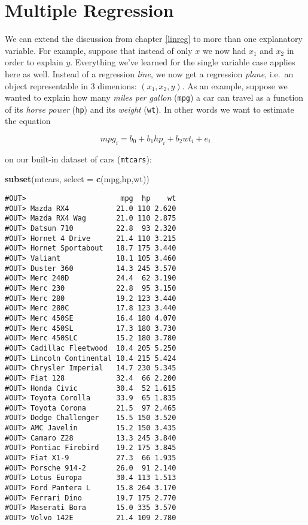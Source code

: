 \documentclass[]{book}
\newenvironment{Shaded}{\begin{snugshade}}{\end{snugshade}}
\newcommand{\KeywordTok}[1]{\textcolor[rgb]{0.13,0.29,0.53}{\textbf{#1}}}
\newcommand{\DataTypeTok}[1]{\textcolor[rgb]{0.13,0.29,0.53}{#1}}
\newcommand{\NormalTok}[1]{#1}
\begin{document}
\chapter{Multiple Regression}\label{multiple-reg}

We can extend the discussion from chapter \ref{linreg} to more than one
explanatory variable. For example, suppose that instead of only \(x\) we
now had \(x_1\) and \(x_2\) in order to explain \(y\). Everything we've
learned for the single variable case applies here as well. Instead of a
regression \emph{line}, we now get a regression \emph{plane}, i.e.~an
object representable in 3 dimenions: \((x_1,x_2,y)\). As an example,
suppose we wanted to explain how many \emph{miles per gallon}
(\texttt{mpg}) a car can travel as a function of its \emph{horse power}
(\texttt{hp}) and its \emph{weight} (\texttt{wt}). In other words we
want to estimate the equation

\begin{equation}
mpg_i = b_0 + b_1 hp_i + b_2 wt_i + e_i \label{eq:abline2d}
\end{equation}

on our built-in dataset of cars (\texttt{mtcars}):

\begin{Shaded}
\begin{Highlighting}[]
\KeywordTok{subset}\NormalTok{(mtcars, }\DataTypeTok{select =} \KeywordTok{c}\NormalTok{(mpg,hp,wt))}
\end{Highlighting}
\end{Shaded}

\begin{verbatim}
#OUT>                      mpg  hp    wt
#OUT> Mazda RX4           21.0 110 2.620
#OUT> Mazda RX4 Wag       21.0 110 2.875
#OUT> Datsun 710          22.8  93 2.320
#OUT> Hornet 4 Drive      21.4 110 3.215
#OUT> Hornet Sportabout   18.7 175 3.440
#OUT> Valiant             18.1 105 3.460
#OUT> Duster 360          14.3 245 3.570
#OUT> Merc 240D           24.4  62 3.190
#OUT> Merc 230            22.8  95 3.150
#OUT> Merc 280            19.2 123 3.440
#OUT> Merc 280C           17.8 123 3.440
#OUT> Merc 450SE          16.4 180 4.070
#OUT> Merc 450SL          17.3 180 3.730
#OUT> Merc 450SLC         15.2 180 3.780
#OUT> Cadillac Fleetwood  10.4 205 5.250
#OUT> Lincoln Continental 10.4 215 5.424
#OUT> Chrysler Imperial   14.7 230 5.345
#OUT> Fiat 128            32.4  66 2.200
#OUT> Honda Civic         30.4  52 1.615
#OUT> Toyota Corolla      33.9  65 1.835
#OUT> Toyota Corona       21.5  97 2.465
#OUT> Dodge Challenger    15.5 150 3.520
#OUT> AMC Javelin         15.2 150 3.435
#OUT> Camaro Z28          13.3 245 3.840
#OUT> Pontiac Firebird    19.2 175 3.845
#OUT> Fiat X1-9           27.3  66 1.935
#OUT> Porsche 914-2       26.0  91 2.140
#OUT> Lotus Europa        30.4 113 1.513
#OUT> Ford Pantera L      15.8 264 3.170
#OUT> Ferrari Dino        19.7 175 2.770
#OUT> Maserati Bora       15.0 335 3.570
#OUT> Volvo 142E          21.4 109 2.780
\end{verbatim}
\end{document}
